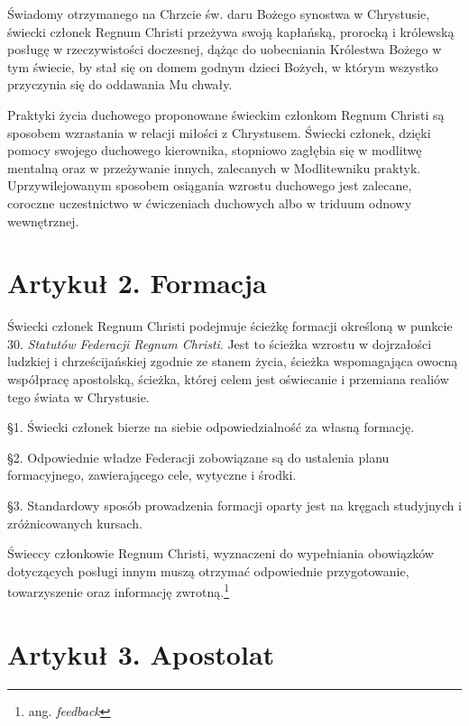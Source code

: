 \filbreak{}

 Świadomy otrzymanego na Chrzcie św. daru Bożego synostwa w Chrystusie, świecki członek Regnum Christi przeżywa swoją kapłańską, prorocką i królewską posługę w rzeczywistości doczesnej, dążąc do uobecniania Królestwa Bożego w tym świecie, by stał się on domem godnym dzieci Bożych, w którym wszystko przyczynia się do oddawania Mu chwały.


 Praktyki życia duchowego proponowane świeckim członkom Regnum Christi są sposobem wzrastania w relacji miłości z Chrystusem. Świecki członek, dzięki pomocy swojego duchowego kierownika, stopniowo zagłębia się w modlitwę mentalną oraz w przeżywanie innych, zalecanych w Modlitewniku praktyk. Uprzywilejowanym sposobem osiągania wzrostu duchowego jest zalecane, coroczne uczestnictwo w ćwiczeniach duchowych albo w triduum odnowy wewnętrznej.


\section{Artykuł 2. Formacja}

 Świecki członek Regnum Christi podejmuje ścieżkę formacji określoną w punkcie 30. {\em Statutów Federacji Regnum Christi}. Jest to ścieżka wzrostu w dojrzałości ludzkiej i chrześcijańskiej zgodnie ze stanem życia, ścieżka wspomagająca owocną współpracę apostolską, ścieżka, której celem jest oświecanie i przemiana realiów tego świata w Chrystusie. 

\filbreak{}

\S{}1. Świecki członek bierze na siebie odpowiedzialność za własną formację.

\S{}2. Odpowiednie władze Federacji zobowiązane są do ustalenia planu formacyjnego, zawierającego cele, wytyczne i środki.

\S{}3. Standardowy sposób prowadzenia formacji oparty jest na kręgach studyjnych i zróżnicowanych kursach.


 Świeccy członkowie Regnum Christi, wyznaczeni do wypełniania obowiązków dotyczących posługi innym muszą otrzymać odpowiednie przygotowanie, towarzyszenie oraz informację zwrotną.\footnote{ang. {\em feedback}}


\section{Artykuł 3. Apostolat}

